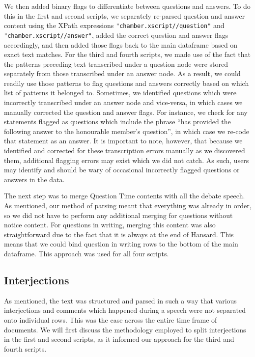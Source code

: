 \documentclass[
  letterpaper,
  DIV=11,
  numbers=noendperiod]{scrartcl}
\begin{document}
We then added binary flags to differentiate between questions and
answers. To do this in the first and second scripts, we separately
re-parsed question and answer content using the XPath expressions
\texttt{"chamber.xscript//question"} and
\texttt{"chamber.xscript//answer"}, added the correct question and
answer flags accordingly, and then added those flags back to the main
dataframe based on exact text matches. For the third and fourth scripts,
we made use of the fact that the patterns preceding text transcribed
under a question node were stored separately from those transcribed
under an answer node. As a result, we could readily use those patterns
to flag questions and answers correctly based on which list of patterns
it belonged to. Sometimes, we identified questions which were
incorrectly transcribed under an answer node and vice-versa, in which
cases we manually corrected the question and answer flags. For instance,
we check for any statements flagged as questions which include the
phrase ``has provided the following answer to the honourable member's
question'', in which case we re-code that statement as an answer. It is
important to note, however, that because we identified and corrected for
these transcription errors manually as we discovered them, additional
flagging errors may exist which we did not catch. As such, users may
identify and should be wary of occasional incorrectly flagged questions
or answers in the data.

The next step was to merge Question Time contents with all the debate
speech. As mentioned, our method of parsing meant that everything was
already in order, so we did not have to perform any additional merging
for questions without notice content. For questions in writing, merging
this content was also straightforward due to the fact that it is always
at the end of Hansard. This means that we could bind question in writing
rows to the bottom of the main dataframe. This approach was used for all
four scripts.

\hypertarget{sec-interject}{%
\subsection{Interjections}\label{sec-interject}}

As mentioned, the text was structured and parsed in such a way that
various interjections and comments which happened during a speech were
not separated onto individual rows. This was the case across the entire
time frame of documents. We will first discuss the methodology employed
to split interjections in the first and second scripts, as it informed
our approach for the third and fourth scripts.
\end{document}

